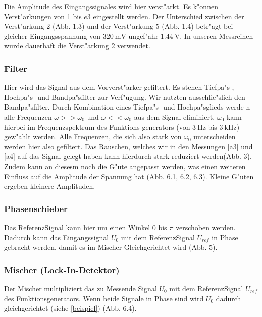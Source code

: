 \documentclass{scrartcl}
\begin{document}
				Die Amplitude des Eingangssignales wird hier verst"arkt. Es k"onnen Verst"arkungen von 1 bis $e3$ eingestellt werden.
				Der Unterschied zwischen der Verst"arkung 2 (Abb. 1.3) und der Verst"arkung 5 (Abb. 1.4) betr"agt bei gleicher 
				Eingangsspannung von $\SI{320}{\milli\volt}$ ungef"ahr $\SI{1,44}{\volt}$. In unseren Messreihen wurde dauerhaft die Verst"arkung 2 verwendet. 

			\subsubsection{Filter}

				Hier wird das Signal aus dem Vorverst"arker gefiltert. Es stehen Tiefpa"s-, Hochpa"s- und Bandpa"sfilter zur Verf"ugung.
				Wir nutzten ausschlie"slich den Bandpa"sfilter. Durch Kombination eines Tiefpa"s- und Hochpa"sglieds werde n alle Frequenzen
				$\omega >> \omega_0$ und $\omega << \omega_0$ aus dem Signal eliminiert.
				$\omega_0$ kann hierbei im Frequenzspektrum des Funktions-generators (von $\SI{3}{\hertz}$ bis $\SI{3}{\kilo\hertz}$) gew"ahlt werden.
				Alle Frequenzen, die sich also stark von $\omega_0$ unterscheiden werden hier also gefiltert.
				Das Rauschen, welches wir in den Messungen \ref{a3} und \ref{a4} auf das Signal gelegt haben kann hierdurch stark reduziert werden(Abb. 3).
				Zudem kann an diesesm noch die G"ute angepasst werden, was einen weiteren Einfluss auf die Amplitude der Spannung hat (Abb. 6.1, 6.2, 6.3).
				Kleine G"uten ergeben kleinere Amplituden.

			\subsubsection{Phasenschieber}

				Das ReferenzSignal kann hier um einen Winkel $0$ bis $\pi$ verschoben werden.
				Dadurch kann das Eingangssignal $U_0$ mit dem ReferenzSignal $U_{ref}$ in Phase gebracht werden,
				damit es im Mischer Gleichgerichtet wird (Abb. 5).

			\subsubsection{Mischer (Lock-In-Detektor)}

				Der Mischer multipliziert das zu Messende Signal $U_0$ mit dem ReferenzSignal $U_{ref}$ des Funktionsgenerators. Wenn beide Signale in Phase sind wird $U_0$ dadurch gleichgerichtet (siehe \vref{beispiel}) (Abb. 6.4).
\end{document}
